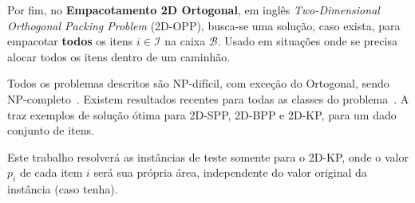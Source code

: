 Por fim, no \textbf{Empacotamento 2D Ortogonal}, em inglês \textit{Two-Dimensional Orthogonal
Packing Problem} (2D-OPP), busca-se uma solução, caso exista, para empacotar \textbf{todos} os
itens $i \in \mathcal{I}$ na caixa $\mathcal{B}$.
Usado em situações onde se precisa alocar todos os itens dentro de um caminhão.

Todos os problemas descritos são NP-difícil, com exceção do Ortogonal, sendo NP-completo~\cite{2DPackLib}.
Existem resultados recentes para todas as classes do problema~\cite{
    cote2014combinatorial,delorme2017logic,velasco2019improved,martin2020models,mrad2015arc,
    cintra2008algorithms,furini2016modeling}.
A  traz exemplos de solução ótima para 2D-SPP, 2D-BPP e 2D-KP,
para um dado conjunto de itens.



Este trabalho resolverá as instâncias de teste somente para o 2D-KP, onde o valor $p_i$ de cada
item $i$ será sua própria área, independente do valor original da instância (caso tenha).

